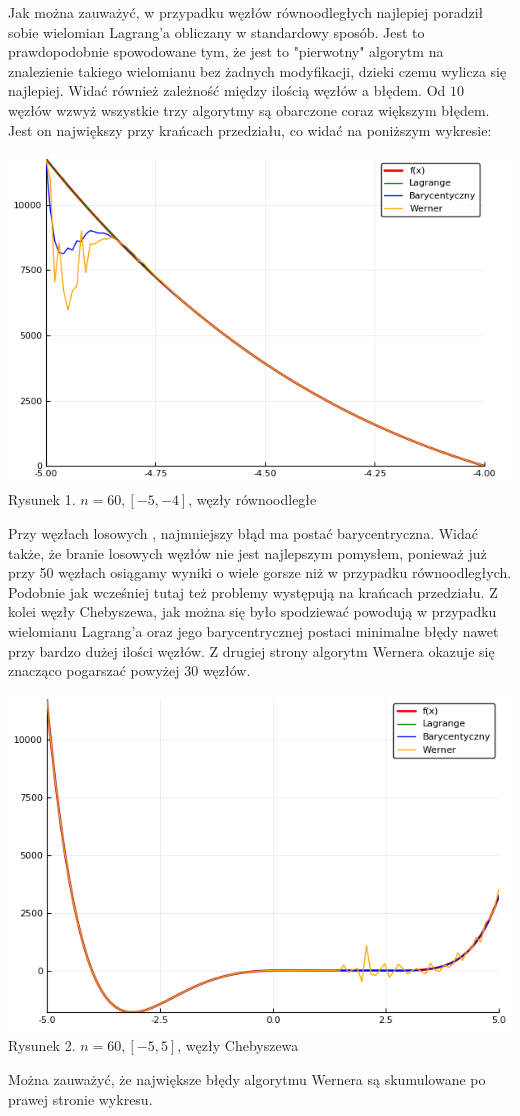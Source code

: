 \documentclass[11pt, wide]{article}
\begin{document}
Jak można zauważyć, w przypadku węzłów równoodległych najlepiej poradził sobie
wielomian Lagrang'a obliczany w standardowy sposób. Jest to prawdopodobnie spowodowane tym,
że jest to "pierwotny" algorytm na znalezienie takiego wielomianu bez żadnych modyfikacji, dzieki czemu
wylicza się najlepiej. Widać również zależność między ilością węzłów a błędem. Od $10$ węzłów
wzwyż wszystkie trzy algorytmy są obarczone coraz większym błędem. Jest on największy
przy krańcach przedziału, co widać na poniższym wykresie:
\begin{center}
    \includegraphics[scale=0.4]{wykres1}\\
    Rysunek 1. $n = 60, [-5,-4]$, węzły równoodległe
\end{center}
Przy węzłach losowych , najmniejszy błąd ma postać barycentryczna. Widać także, że branie
losowych węzłów nie jest najlepszym pomysłem, ponieważ już przy 50 węzłach osiągamy wyniki o wiele gorsze niż w przypadku
równoodległych. Podobnie jak wcześniej tutaj też problemy występują na krańcach przedziału. Z kolei węzły 
Chebyszewa, jak można się było spodziewać powodują w przypadku wielomianu Lagrang'a oraz jego barycentrycznej postaci
minimalne błędy nawet przy bardzo dużej ilości węzłów. Z drugiej strony algorytm Wernera okazuje się znacząco pogarszać
powyżej 30 węzłów.
\begin{center}
    \includegraphics[scale=0.4]{wykres2}\\
    Rysunek 2. $n = 60, [-5,5]$, węzły Chebyszewa
\end{center}
Można zauważyć, że największe błędy algorytmu Wernera są skumulowane po prawej stronie wykresu.
\end{document}
